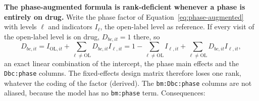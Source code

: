 \documentclass[11pt]{article}
\newcommand{\code}[1]{\texttt{#1}}
\begin{document}
\textbf{The phase-augmented formula is rank-deficient whenever a phase
is entirely on drug.} Write the phase factor of
Equation~\eqref{eq:phase-augmented} with levels $\ell$ and indicators
$I_\ell$, the open-label level as reference. If every visit of the
open-label level is on drug, $D_{bc,it} = 1$ there, so
\begin{equation}
D_{bc,it} = I_{\mathrm{OL},it} + \sum_{\ell \ne \mathrm{OL}}
  D_{bc,it} I_{\ell,it}
  = 1 - \sum_{\ell \ne \mathrm{OL}} I_{\ell,it} +
  \sum_{\ell \ne \mathrm{OL}} D_{bc,it} I_{\ell,it},
\label{eq:invb-alias}
\end{equation}
an exact linear combination of the intercept, the phase main effects
and the \code{Dbc:phase} columns. The fixed-effects design matrix
therefore loses one rank, whatever the coding of the factor (derived).
The \code{bm:Dbc:phase} columns are not aliased, because the model has
no \code{bm:phase} term. Consequences:
\end{document}
